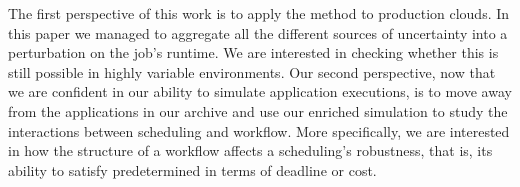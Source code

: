 \documentclass[10pt,conference,compsocconf]{IEEEtran}
\begin{document}
The  first  perspective of  this  work  is to  apply  the  method to  production
clouds.  In this  paper we  managed to  aggregate all  the different  sources of
uncertainty  into a  perturbation on  the job's  runtime. We  are interested  in
checking whether  this is  still possible in  highly variable  environments. Our
second  perspective, now  that  we  are confident  in  our  ability to  simulate
application executions, is to move away from the applications in our archive and
use our  enriched simulation  to study the  interactions between  scheduling and
workflow.  More specifically,  we  are  interested in  how  the  structure of  a
workflow  affects a  scheduling's robustness,  that is,  its ability  to satisfy
predetermined  in terms of deadline or cost.










\newpage
\end{document}
